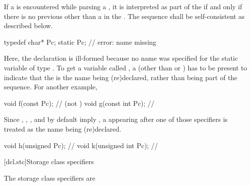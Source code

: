 \pnum
{}%
If a  is encountered while parsing a ,
it is interpreted as part of the  if and only if there is no
previous  other than a  in the
.
The sequence shall be self-consistent as
described below.
\begin{example}
\begin{codeblock}
typedef char* Pc;
static Pc;                      // error: name missing
\end{codeblock}
Here, the declaration   is ill-formed because no
name was specified for the static variable of type . To get a
variable called , a  (other than
 or ) has to be present to indicate that
the   is the name being (re)declared,
rather than being part of the  sequence. For
another example,
\begin{codeblock}
void f(const Pc);               //  (not )
void g(const int Pc);           // 
\end{codeblock}
\end{example}

\pnum
{}%
%
%
%
\begin{note}
Since , , , and 
by default imply , a  appearing after one
of those specifiers is treated as the name being (re)declared.
\begin{example}
\begin{codeblock}
void h(unsigned Pc);            // 
void k(unsigned int Pc);        // 
\end{codeblock}
\end{example}
\end{note}

[dcl.stc]{Storage class specifiers}%
%
%

\pnum
The storage class specifiers are
\begin{bnf}
\br
    \br
    \br
    \br
\end{bnf}

